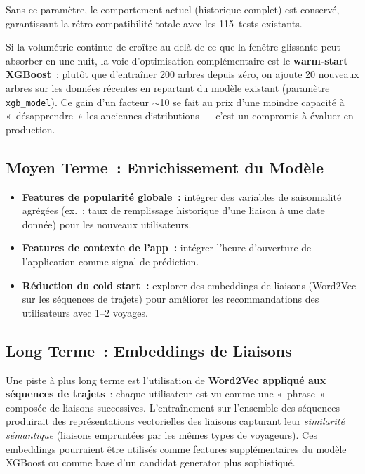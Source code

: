 \documentclass[12pt, a4paper]{report}
\begin{document}
Sans ce paramètre, le comportement actuel (historique complet) est conservé,
garantissant la rétro-compatibilité totale avec les 115~tests existants.

Si la volumétrie continue de croître au-delà de ce que la fenêtre glissante
peut absorber en une nuit, la voie d'optimisation complémentaire est le
\textbf{warm-start XGBoost}~: plutôt que d'entraîner 200 arbres depuis zéro,
on ajoute 20 nouveaux arbres sur les données récentes en repartant du modèle
existant (paramètre \texttt{xgb\_model}). Ce gain d'un facteur $\sim$10 se
fait au prix d'une moindre capacité à «~désapprendre~» les anciennes
distributions --- c'est un compromis à évaluer en production.

\subsection{Moyen Terme~: Enrichissement du Modèle}

\begin{itemize}
\item \textbf{Features de popularité globale~:} intégrer des variables de
    saisonnalité agrégées (ex.~: taux de remplissage historique d'une liaison
    à une date donnée) pour les nouveaux utilisateurs.
\item \textbf{Features de contexte de l'app~:} intégrer l'heure d'ouverture
    de l'application comme signal de prédiction.
\item \textbf{Réduction du cold start~:} explorer des embeddings de liaisons
    (Word2Vec sur les séquences de trajets) pour améliorer les recommandations
    des utilisateurs avec 1--2 voyages.
\end{itemize}

\subsection{Long Terme~: Embeddings de Liaisons}

Une piste à plus long terme est l'utilisation de \textbf{Word2Vec appliqué
aux séquences de trajets}~: chaque utilisateur est vu comme une «~phrase~»
composée de liaisons successives. L'entraînement sur l'ensemble des séquences
produirait des représentations vectorielles des liaisons capturant leur
\textit{similarité sémantique} (liaisons empruntées par les mêmes types de
voyageurs). Ces embeddings pourraient être utilisés comme features
supplémentaires du modèle XGBoost ou comme base d'un candidat generator
plus sophistiqué.
\end{document}
